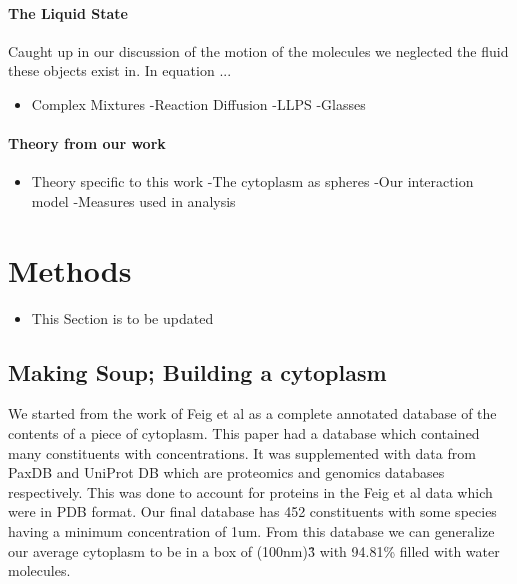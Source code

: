 \documentclass[a4paper,11pt,oneside]{book}
\begin{document}
\paragraph{The Liquid State}

Caught up in our discussion of the motion of the molecules we neglected the fluid these objects exist in. In equation ...

\begin{itemize}
\item Complex Mixtures \newline
-Reaction Diffusion \newline
-LLPS \newline
-Glasses
\end{itemize}

\paragraph{Theory from our work}

\begin{itemize}
\item Theory specific to this work \newline
-The cytoplasm as spheres \newline
-Our interaction model \newline
-Measures used in analysis
\end{itemize}

\section{Methods}

\begin{itemize}
\item This Section is to be updated
\end{itemize}

\subsection{Making Soup; Building a cytoplasm}

We started from the work of Feig et al as a complete annotated database of the contents of a piece of cytoplasm. This paper had a database which contained many constituents with concentrations. It was supplemented with data from PaxDB and UniProt DB which are proteomics and genomics databases respectively. This was done to account for proteins in the Feig et al data which were in PDB format. Our final database has 452 constituents with some species having a minimum concentration of 1um. From this database we can generalize our average cytoplasm to be in a box of (100nm)\^3 with 94.81\% filled with water molecules.
\end{document}
